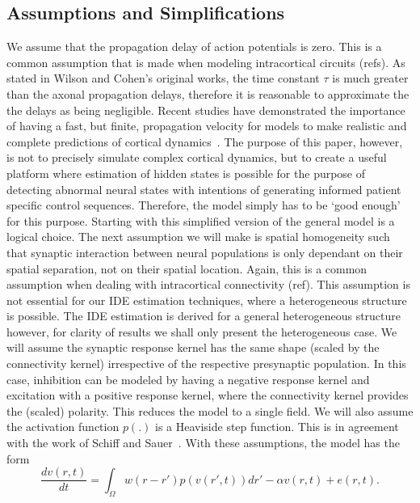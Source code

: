 \documentclass[onecolumn,draftcls]{IEEEtran}
\begin{document}
\subsection{Assumptions and Simplifications}
We assume that the propagation delay of action potentials is zero. This is a common assumption that is made when modeling intracortical circuits (\textcolor[rgb]{1.00,0.00,0.00}{refs}). As stated in Wilson and Cohen's original works, the time constant $\tau$ is much greater than the axonal propagation delays, therefore it is reasonable to approximate the the delays as being negligible. Recent studies have demonstrated the importance of having a fast, but finite, propagation velocity for models to make realistic and complete predictions of cortical dynamics~\cite{Atay2005}. The purpose of this paper, however, is not to precisely simulate complex cortical dynamics, but to create a useful platform where estimation of hidden states is possible for the purpose of detecting abnormal neural states with intentions of generating informed patient specific control sequences. Therefore, the model simply has to be `good enough' for this purpose. Starting with this simplified version of the general model is a logical choice. The next assumption we will make is spatial homogeneity such that synaptic interaction between neural populations is only dependant on their spatial separation, not on their spatial location. Again, this is a common assumption when dealing with intracortical connectivity (\textcolor[rgb]{1.00,0.00,0.00}{ref}). This assumption is not essential for our IDE estimation techniques, where a heterogeneous structure is possible. The IDE estimation is derived for a general heterogeneous structure however, for clarity of results we shall only present the heterogeneous case. We will assume the synaptic response kernel has the same shape (scaled by the connectivity kernel) irrespective of the respective presynaptic population. In this case, inhibition can be modeled by having a negative response kernel and excitation with a positive response kernel, where the connectivity kernel provides the (scaled) polarity. This reduces the model to a single field. We will also assume the activation function $p(.)$ is a Heaviside step function. This is in agreement with the work of Schiff and Sauer~\cite{schiff2008kalman}. With these assumptions, the model has the form
\begin{equation}\label{SimplifiedModel}
\frac{{dv\left( {r,t} \right)}}{{dt}} = \int_\Omega  {w\left( {r-r'} \right)p\left( {v\left( {r',t} \right)} \right)dr'}  - \alpha{v\left( {r,t} \right)} + e\left( {r,t} \right).
\end{equation}
\end{document}
